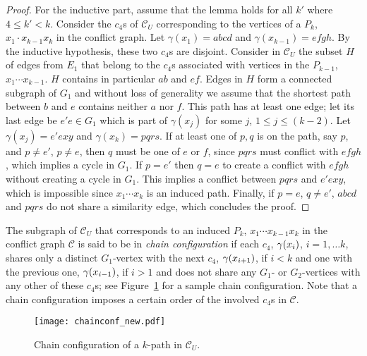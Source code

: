 \documentclass[final]{dmtcs-episciences}
\newcommand\mar[1]{\textcolor{black}{#1}}
\begin{document}
\begin{proof}
For the inductive part, assume that the lemma holds for all $k'$ where $4\leq k'< k$. Consider the $c_4$s of $\mathcal{C}_U$ corresponding to the vertices of a $P_{k}$, \mar{$x_1\cdot x_{k-1}x_k$} in the conflict graph. 
Let $\gamma(x_1)=abcd$ and $\gamma(x_{k-1})=efgh$. By the inductive hypothesis, these two $c_4$s are disjoint. Consider in 
$\mathcal{C}_U$ the subset $H$ of edges from $E_1$ that belong to the $c_4$s  associated with vertices in the  $P_{k-1}$, $x_1\cdots x_{k-1}$. $H$ contains in particular $ab$ and $ef$. Edges in $H$ form a connected subgraph  of $G_1$ and without loss of generality we assume that the shortest path  between $b$ and $e$  contains neither $a$ nor $f$. This path  has at least one edge; let its last edge be $e'e\in G_1$ which is part of $\gamma(x_j)$ for some $j$, $1\leq j\leq (k-2)$. Let $\gamma(x_j)=e'exy$  and $\gamma(x_k)=pqrs$. If at least one of $p, q$ is on the path, say $p$, and $p\neq e'$, $p\neq e$, then $q$ must be one of $e$ or $f$, since $pqrs$ must conflict with $efgh$, which implies a cycle in $G_1$.  If $p=e'$ then $q=e$ to create a conflict with $efgh$ without creating a cycle in $G_1$.   
This implies a conflict between $pqrs$ and $e'exy$, which is impossible since  
$x_1\cdots x_k$ is an induced path. Finally, if $p=e$, $q\neq e'$, $abcd$ and $pqrs$ do not share a similarity edge, which concludes the proof.
\end{proof}

The subgraph of $\mathcal{C}_U$ that corresponds to an induced $P_k$, \mar{$x_1\cdots x_{k-1}x_k$} in the conflict graph $\mathcal{C}$
is said to be in  \emph{ chain configuration} if each $c_4$, $\gamma(\mar{x_i})$, $i=1, \ldots k$, shares only a distinct $G_1$-vertex with the next $c_4$, $\gamma(\mar{x_{i+1}})$, if $i<k$ and one with the previous one, $\gamma(\mar{x_{i-1}})$, if $i>1$
 and does not share any $G_1$- or $G_2$-vertices with any other of these $c_4$s; see Figure~\ref{chain} for a sample chain configuration. 
Note that a chain configuration imposes a certain order of the involved $c_4$s in $\mathcal{C}$. 

\begin{figure}[t]	   
\begin{center}	   
\texttt{[image: chainconf\_new.pdf]} 
\caption{\sf Chain configuration of a $k$-path in $\mathcal{C}_U$. } 
\label{chain}	   
\end{center}	   
\end{figure}  
\end{document}
